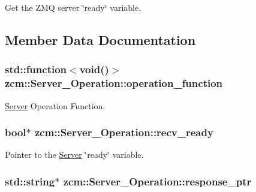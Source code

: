 Get the Z\-M\-Q server \char`\"{}ready\char`\"{} variable. 



\subsection{Member Data Documentation}
\hypertarget{classzcm_1_1Server__Operation_af6df162db0b1f42248b52c8925dcc64d}{
\subsubsection[{operation\-\_\-function}]{\setlength{\rightskip}{0pt plus 5cm}std\-::function$<$void()$>$ zcm\-::\-Server\-\_\-\-Operation\-::operation\-\_\-function\hspace{0.3cm}{\ttfamily [private]}}}\label{classzcm_1_1Server__Operation_af6df162db0b1f42248b52c8925dcc64d}


\hyperlink{classzcm_1_1Server}{Server} Operation Function. 

\hypertarget{classzcm_1_1Server__Operation_a2b71778be842aedf6d122b531e186ca8}{
\subsubsection[{recv\-\_\-ready}]{\setlength{\rightskip}{0pt plus 5cm}bool$\ast$ zcm\-::\-Server\-\_\-\-Operation\-::recv\-\_\-ready\hspace{0.3cm}{\ttfamily [private]}}}\label{classzcm_1_1Server__Operation_a2b71778be842aedf6d122b531e186ca8}


Pointer to the \hyperlink{classzcm_1_1Server}{Server} \char`\"{}ready\char`\"{} variable. 

\hypertarget{classzcm_1_1Server__Operation_add538216fe0c56f8edd74c12d9b5f224}{
\subsubsection[{response\-\_\-ptr}]{\setlength{\rightskip}{0pt plus 5cm}std\-::string$\ast$ zcm\-::\-Server\-\_\-\-Operation\-::response\-\_\-ptr\hspace{0.3cm}{\ttfamily [private]}}}\label{classzcm_1_1Server__Operation_add538216fe0c56f8edd74c12d9b5f224}



